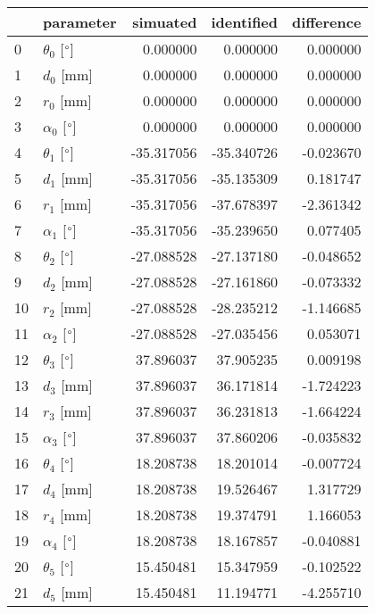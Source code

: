 \documentclass{standalone}%
\begin{document}
%
\normalsize%
\begin{tabular}{llrrr}
\toprule
{} &                 parameter &   simuated & identified & difference \\
\midrule
0  &  $\theta_{0}$ [$\degree$] &   0.000000 &   0.000000 &   0.000000 \\
1  &              $d_{0}$ [mm] &   0.000000 &   0.000000 &   0.000000 \\
2  &              $r_{0}$ [mm] &   0.000000 &   0.000000 &   0.000000 \\
3  &  $\alpha_{0}$ [$\degree$] &   0.000000 &   0.000000 &   0.000000 \\
4  &  $\theta_{1}$ [$\degree$] & -35.317056 & -35.340726 &  -0.023670 \\
5  &              $d_{1}$ [mm] & -35.317056 & -35.135309 &   0.181747 \\
6  &              $r_{1}$ [mm] & -35.317056 & -37.678397 &  -2.361342 \\
7  &  $\alpha_{1}$ [$\degree$] & -35.317056 & -35.239650 &   0.077405 \\
8  &  $\theta_{2}$ [$\degree$] & -27.088528 & -27.137180 &  -0.048652 \\
9  &              $d_{2}$ [mm] & -27.088528 & -27.161860 &  -0.073332 \\
10 &              $r_{2}$ [mm] & -27.088528 & -28.235212 &  -1.146685 \\
11 &  $\alpha_{2}$ [$\degree$] & -27.088528 & -27.035456 &   0.053071 \\
12 &  $\theta_{3}$ [$\degree$] &  37.896037 &  37.905235 &   0.009198 \\
13 &              $d_{3}$ [mm] &  37.896037 &  36.171814 &  -1.724223 \\
14 &              $r_{3}$ [mm] &  37.896037 &  36.231813 &  -1.664224 \\
15 &  $\alpha_{3}$ [$\degree$] &  37.896037 &  37.860206 &  -0.035832 \\
16 &  $\theta_{4}$ [$\degree$] &  18.208738 &  18.201014 &  -0.007724 \\
17 &              $d_{4}$ [mm] &  18.208738 &  19.526467 &   1.317729 \\
18 &              $r_{4}$ [mm] &  18.208738 &  19.374791 &   1.166053 \\
19 &  $\alpha_{4}$ [$\degree$] &  18.208738 &  18.167857 &  -0.040881 \\
20 &  $\theta_{5}$ [$\degree$] &  15.450481 &  15.347959 &  -0.102522 \\
21 &              $d_{5}$ [mm] &  15.450481 &  11.194771 &  -4.255710 \\

\end{tabular}
\end{document}
